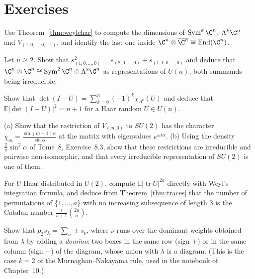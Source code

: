 \section{Exercises}

\begin{exercise}[$\star$]\label{ex:dims}
Use Theorem~\ref{thm:weylchar} to compute the dimensions of $\operatorname{Sym}^k\C^n$, $\Lambda^k\C^n$ and $V_{(1,0,\dots,0,-1)}$, and identify the last one inside $\C^n\otimes\overline{\C^n}\cong\operatorname{End}(\C^n)$.
\end{exercise}

\begin{exercise}[$\star$]\label{ex:tensorsquare}
Let $n\ge2$.
Show that $s_{(1,0,\dots,0)}^2=s_{(2,0,\dots,0)}+s_{(1,1,0,\dots,0)}$ and deduce that $\C^n\otimes\C^n\cong\operatorname{Sym}^2\C^n\oplus\Lambda^2\C^n$ as representations of $U(n)$, both summands being irreducible.
\end{exercise}

\begin{exercise}[$\star\star$]\label{ex:charpoly}
Show that $\det(I-U)=\sum_{k=0}^n(-1)^k\chi_{\Lambda^k}(U)$ and deduce that $\mathbb E|\det(I-U)|^2=n+1$ for a Haar random $U\in U(n)$.
\end{exercise}

\begin{exercise}[$\star\star$]\label{ex:su2}
(a) Show that the restriction of $V_{(m,0)}$ to $SU(2)$ has the character $\chi_m=\frac{\sin(m+1)\alpha}{\sin\alpha}$ at the matrix with eigenvalues $e^{\pm i\alpha}$. (b) Using the density $\frac2\pi\sin^2\alpha$ of Tome~8, Exercise~8.3, show that these restrictions are irreducible and
pairwise non-isomorphic, and that every irreducible representation of $SU(2)$ is one of them.
\end{exercise}

\begin{exercise}[$\star\star$]\label{ex:catalanu2}
For $U$ Haar distributed in $U(2)$, compute $\mathbb E|\operatorname{tr}U|^{2a}$ directly with Weyl's integration formula, and deduce from Theorem~\ref{thm:traces} that the number of permutations of $\{1,\dots,a\}$ with no increasing subsequence of length $3$ is the
Catalan number $\frac1{a+1}\binom{2a}a$.
\end{exercise}

\begin{exercise}[$\star\star\star$]\label{ex:domino}
Show that $p_2s_\lambda=\sum_\nu\pm s_\nu$, where $\nu$ runs over the dominant weights obtained from $\lambda$ by adding a \emph{domino}: two boxes in the same row (sign $+$) or in the same column (sign $-$) of the diagram, whose union with $\lambda$ is a diagram. (This is the
case $k=2$ of the Murnaghan--Nakayama rule, used in the notebook of Chapter~10.)
\end{exercise}

